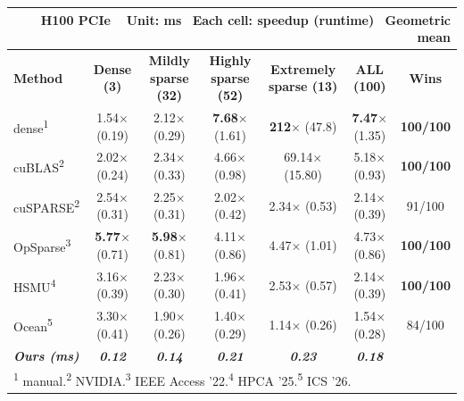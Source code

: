 
\begin{table}[t]
\centering
\setlength{\tabcolsep}{5pt}
\renewcommand{\arraystretch}{1.2}
\begin{tabular}{l c c c c c c}
\multicolumn{7}{r}{\hfill \footnotesize\color{gray} \textbf{H100 PCIe} \,\,\, \textbf{Unit}: ms\,\,\, \textbf{Each cell}: speedup (runtime)\,\,\, \textbf{Geometric} mean}\\
\hline\hline
\textbf{Method} & \textbf{Dense (3)} & \textbf{Mildly sparse (32)} & \textbf{Highly sparse (52)} & \textbf{Extremely sparse (13)} & \textbf{ALL (100)} & \textbf{Wins}\\
\hline
dense\textsuperscript{1} & 1.54$\times$ {\small\color{gray}(0.19)} & 2.12$\times$ {\small\color{gray}(0.29)} & \textbf{7.68$\times$} {\small\color{gray}(1.61)} & \textbf{212$\times$} {\small\color{gray}(47.8)} & \textbf{7.47$\times$} {\small\color{gray}(1.35)} & \textbf{100/100} \\
cuBLAS\textsuperscript{2} & 2.02$\times$ {\small\color{gray}(0.24)} & 2.34$\times$ {\small\color{gray}(0.33)} & 4.66$\times$ {\small\color{gray}(0.98)} & 69.14$\times$ {\small\color{gray}(15.80)} & 5.18$\times$ {\small\color{gray}(0.93)} & \textbf{100/100} \\
cuSPARSE\textsuperscript{2} & 2.54$\times$ {\small\color{gray}(0.31)} & 2.25$\times$ {\small\color{gray}(0.31)} & 2.02$\times$ {\small\color{gray}(0.42)} & 2.34$\times$ {\small\color{gray}(0.53)} & 2.14$\times$ {\small\color{gray}(0.39)} & 91/100 \\
OpSparse\textsuperscript{3} & \textbf{5.77$\times$} {\small\color{gray}(0.71)} & \textbf{5.98$\times$} {\small\color{gray}(0.81)} & 4.11$\times$ {\small\color{gray}(0.86)} & 4.47$\times$ {\small\color{gray}(1.01)} & 4.73$\times$ {\small\color{gray}(0.86)} & \textbf{100/100} \\
HSMU\textsuperscript{4} & 3.16$\times$ {\small\color{gray}(0.39)} & 2.23$\times$ {\small\color{gray}(0.30)} & 1.96$\times$ {\small\color{gray}(0.41)} & 2.53$\times$ {\small\color{gray}(0.57)} & 2.14$\times$ {\small\color{gray}(0.39)} & \textbf{100/100} \\
Ocean\textsuperscript{5} & 3.30$\times$ {\small\color{gray}(0.41)} & 1.90$\times$ {\small\color{gray}(0.26)} & 1.40$\times$ {\small\color{gray}(0.29)} & 1.14$\times$ {\small\color{gray}(0.26)} & 1.54$\times$ {\small\color{gray}(0.28)} & 84/100 \\
\textbf{\textit{Ours (ms)}} & \textbf{\textit{0.12}} & \textbf{\textit{0.14}} & \textbf{\textit{0.21}} & \textbf{\textit{0.23}} & \textbf{\textit{0.18}} &  \\
\hline\hline
\multicolumn{7}{l}{\footnotesize\color{gray} \textsuperscript{1} manual.\quad \textsuperscript{2} NVIDIA.\quad \textsuperscript{3} IEEE Access '22.\quad \textsuperscript{4} HPCA '25.\quad \textsuperscript{5} ICS '26.}
\end{tabular}
\end{table}



